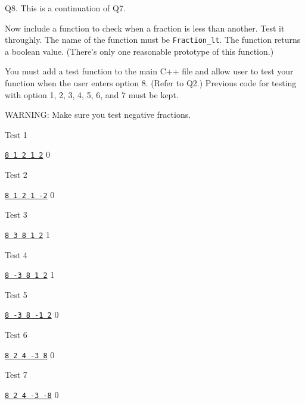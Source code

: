 Q8.
This is a continuation of Q7.

Now include a function to check when a fraction is less than another.
Test it throughly.
The name of the function must be \verb!Fraction_lt!.
The function returns a boolean value.
(There's only one reasonable prototype of this function.)

You must add a test function to the main C++ file and allow user to test
your function when the user enters option 8. (Refer to Q2.)
Previous code for testing with option 1, 2, 3, 4, 5, 6, and 7 must be kept.

WARNING: Make sure you test negative fractions.

Test 1
\begin{console}[commandchars=\\\{\}]
\underline{\texttt{8 1 2 1 2}}
0
\end{console}

Test 2
\begin{console}[commandchars=\\\{\}]
\underline{\texttt{8 1 2 1 -2}}
0
\end{console}

Test 3
\begin{console}[commandchars=\\\{\}]
\underline{\texttt{8 3 8 1 2}}
1
\end{console}

Test 4
\begin{console}[commandchars=\\\{\}]
\underline{\texttt{8 -3 8 1 2}}
1
\end{console}

Test 5
\begin{console}[commandchars=\\\{\}]
\underline{\texttt{8 -3 8 -1 2}}
0
\end{console}

Test 6
\begin{console}[commandchars=\\\{\}]
\underline{\texttt{8 2 4 -3 8}}
0
\end{console}

Test 7
\begin{console}[commandchars=\\\{\}]
\underline{\texttt{8 2 4 -3 -8}}
0
\end{console}




